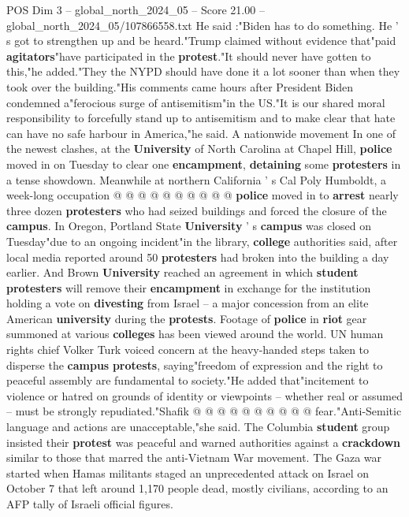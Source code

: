 \begin{textsample}{POS Dim 3 – global\_north\_2024\_05 – Score 21.00 – global\_north\_2024\_05/107866558.txt}
He said :"Biden has to do something.
He ' s got to strengthen up and be heard."Trump claimed without evidence that"paid \textbf{agitators}"have participated in the \textbf{protest}."It should never have gotten to this,"he added."They the NYPD should have done it a lot sooner than when they took over the building."His comments came hours after President Biden condemned a"ferocious surge of antisemitism"in the US."It is our shared moral responsibility to forcefully stand up to antisemitism and to make clear that hate can have no safe harbour in America,"he said.
A nationwide movement In one of the newest clashes, at the \textbf{University} of North Carolina at Chapel Hill, \textbf{police} moved in on Tuesday to clear one \textbf{encampment}, \textbf{detaining} some \textbf{protesters} in a tense showdown.
Meanwhile at northern California ' s Cal Poly Humboldt, a week-long occupation @ @ @ @ @ @ @ @ @ @ \textbf{police} moved in to \textbf{arrest} nearly three dozen \textbf{protesters} who had seized buildings and forced the closure of the \textbf{campus}.
In Oregon, Portland State \textbf{University} ' s \textbf{campus} was closed on Tuesday"due to an ongoing incident"in the library, \textbf{college} authorities said, after local media reported around 50 \textbf{protesters} had broken into the building a day earlier.
And Brown \textbf{University} reached an agreement in which \textbf{student} \textbf{protesters} will remove their \textbf{encampment} in exchange for the institution holding a vote on \textbf{divesting} from Israel -- a major concession from an elite American \textbf{university} during the \textbf{protests}.
Footage of \textbf{police} in \textbf{riot} gear summoned at various \textbf{colleges} has been viewed around the world.
UN human rights chief Volker Turk voiced concern at the heavy-handed steps taken to disperse the \textbf{campus} \textbf{protests}, saying"freedom of expression and the right to peaceful assembly are fundamental to society."He added that"incitement to violence or hatred on grounds of identity or viewpoints -- whether real or assumed -- must be strongly repudiated."Shafik @ @ @ @ @ @ @ @ @ @ fear."Anti-Semitic language and actions are unacceptable,"she said.
The Columbia \textbf{student} group insisted their \textbf{protest} was peaceful and warned authorities against a \textbf{crackdown} similar to those that marred the anti-Vietnam War movement.
The Gaza war started when Hamas militants staged an unprecedented attack on Israel on October 7 that left around 1,170 people dead, mostly civilians, according to an AFP tally of Israeli official figures.

\end{textsample}
